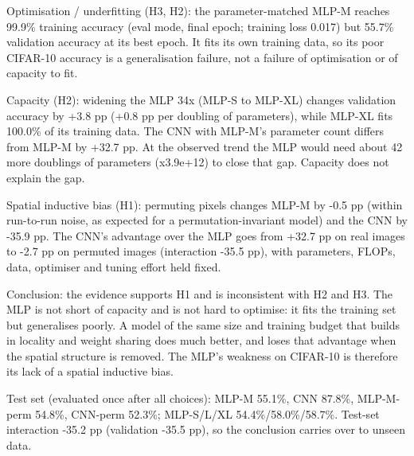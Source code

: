 Optimisation / underfitting (H3, H2): the parameter-matched MLP-M reaches 99.9\% training accuracy (eval mode, final epoch; training loss 0.017) but 55.7\% validation accuracy at its best epoch. It fits its own training data, so its poor CIFAR-10 accuracy is a generalisation failure, not a failure of optimisation or of capacity to fit.

Capacity (H2): widening the MLP 34x (MLP-S to MLP-XL) changes validation accuracy by +3.8 pp (+0.8 pp per doubling of parameters), while MLP-XL fits 100.0\% of its training data. The CNN with MLP-M's parameter count differs from MLP-M by +32.7 pp. At the observed trend the MLP would need about 42 more doublings of parameters (x3.9e+12) to close that gap. Capacity does not explain the gap.

Spatial inductive bias (H1): permuting pixels changes MLP-M by -0.5 pp (within run-to-run noise, as expected for a permutation-invariant model) and the CNN by -35.9 pp. The CNN's advantage over the MLP goes from +32.7 pp on real images to -2.7 pp on permuted images (interaction -35.5 pp), with parameters, FLOPs, data, optimiser and tuning effort held fixed.

Conclusion: the evidence supports H1 and is inconsistent with H2 and H3. The MLP is not short of capacity and is not hard to optimise: it fits the training set but generalises poorly. A model of the same size and training budget that builds in locality and weight sharing does much better, and loses that advantage when the spatial structure is removed. The MLP's weakness on CIFAR-10 is therefore its lack of a spatial inductive bias.

Test set (evaluated once after all choices): MLP-M 55.1\%, CNN 87.8\%, MLP-M-perm 54.8\%, CNN-perm 52.3\%; MLP-S/L/XL 54.4\%/58.0\%/58.7\%. Test-set interaction -35.2 pp (validation -35.5 pp), so the conclusion carries over to unseen data.
